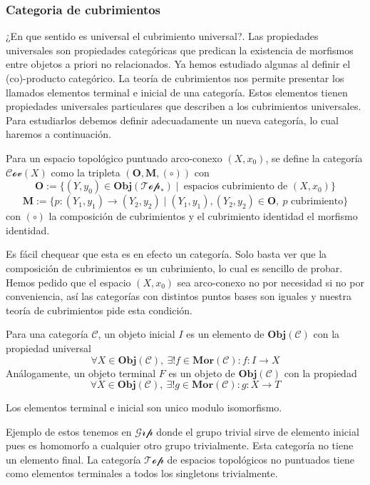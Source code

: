 \subsubsection{Categoria de cubrimientos}
¿En que sentido es universal el cubrimiento universal?. Las propiedades
universales son propiedades categóricas que predican la existencia de
morfismos entre objetos a priori no relacionados. Ya hemos estudiado
algunas al definir el (co)-producto categórico. La teoría de cubrimientos
nos permite presentar los llamados elementos terminal e inicial de
una categoría. Estos elementos tienen propiedades universales
particulares que describen a los cubrimientos universales. Para
estudiarlos debemos definir adecuadamente un nueva categoría, lo cual
haremos a continuación.
\begin{definicion}
  Para un espacio topológico puntuado arco-conexo \((X,x_0)\), se define
  la categoría \(\mathscr{Cov}(X)\) como la tripleta \(\left( \mathbf O,
  \mathbf M, (\circ) \right)\) con
\[ \mathbf O := \{ (Y, y_0) \in \mathbf{Obj}(\mathscr{Top_*}) \mid
    \ \text{espacios cubrimiento de } (X, x_0) \}\]
\[ \mathbf M := \{ p : (Y_1, y_1) \to (Y_2, y_2) \mid (Y_1, y_1), (Y_2,
  y_2) \in \mathbf O ,\ p \text{ cubrimiento}\}\]
  con \((\circ)\) la composición de cubrimientos y el cubrimiento
  identidad el morfismo identidad.
\end{definicion}
Es fácil chequear que esta es en efecto un categoría. Solo basta ver
que la composición de cubrimientos es un cubrimiento, lo cual es
sencillo de probar. Hemos pedido que el espacio \((X, x_0)\) sea
arco-conexo no por necesidad si no por conveniencia, así las categorías
con distintos puntos bases son iguales y nuestra teoría de cubrimientos
pide esta condición.

\begin{definicion}
  Para una categoría \(\mathscr C\), un objeto inicial \(I\) es un
  elemento de \(\mathbf{Obj} (\mathscr C)\) con la propiedad universal
  \[ \forall X \in \mathbf{Obj}(\mathscr C),\ \exists ! f \in
    \mathbf{Mor} (\mathscr C) : f : I \to X \]
  Análogamente, un objeto terminal \(F\) es un objeto de
  \(\mathbf{Obj} (\mathscr C)\) con la propiedad
  \[ \forall X \in \mathbf{Obj}(\mathscr C),\ \exists ! g \in
    \mathbf{Mor} (\mathscr C) : g : X \to T \]
\end{definicion}
\begin{acotacion}
  Los elementos terminal e inicial son unico modulo isomorfismo.
\end{acotacion}
Ejemplo de estos tenemos en \(\mathscr{Grp}\) donde el grupo trivial
sirve de elemento inicial pues es homomorfo a cualquier otro grupo
trivialmente. Esta categoría no tiene un elemento final. La categoría
\(\mathscr {Top}\) de espacios topológicos no puntuados tiene como
elementos terminales a todos los singletons trivialmente.

